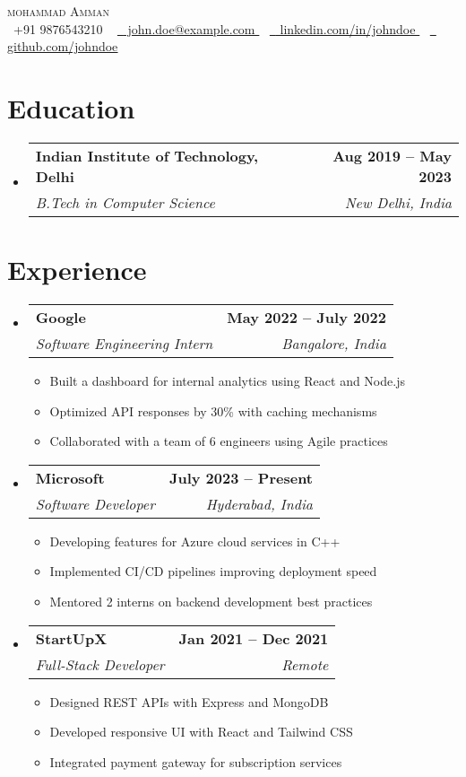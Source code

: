 \documentclass[letterpaper,11pt]{article}
\makeatletter
\newcommand{\resumeItem}[1]{\item\small{#1 \vspace{-2pt}}}
\newcommand{\resumeSubheading}[4]{
  \vspace{-2pt}\item
    \begin{tabular*}{1.0\textwidth}[t]{l@{\extracolsep{\fill}}r}
      \textbf{#1} & \textbf{\small #2} \\
      \textit{\small#3} & \textit{\small #4} \\
    \end{tabular*}\vspace{-7pt}
}
\newcommand{\resumeSubHeadingListStart}{\begin{itemize}[leftmargin=0.0in, label={}]}
\newcommand{\resumeSubHeadingListEnd}{\end{itemize}}
\newcommand{\resumeItemListStart}{\begin{itemize}}
\newcommand{\resumeItemListEnd}{\end{itemize}\vspace{-5pt}}
\makeatother
\begin{document}
\begin{center}
    {\Huge \scshape mohammad Amman } \\ \vspace{1pt}
    \small \raisebox{-0.1\height}\faPhone\ +91 9876543210 ~
    \href{mailto:john.doe@example.com }{\raisebox{-0.2\height}\faEnvelope\  \underline{ john.doe@example.com }} ~
    \href{https://linkedin.com/in/johndoe }{\raisebox{-0.2\height}\faLinkedin\ \underline{ linkedin.com/in/johndoe }}  ~
    \href{https://github.com/johndoe }{\raisebox{-0.2\height}\faGithub\ \underline{ github.com/johndoe }}
    \vspace{-8pt}
\end{center}
\section{Education}
\resumeSubHeadingListStart
  \resumeSubheading
    { Indian Institute of Technology, Delhi }{ Aug 2019 – May 2023 }
    { B.Tech in Computer Science }{ New Delhi, India }
\resumeSubHeadingListEnd

\section{Experience}
\resumeSubHeadingListStart
  \resumeSubheading
    { Google }{ May 2022 -- July 2022 }
    { Software Engineering Intern }{ Bangalore, India }
    \resumeItemListStart
      \resumeItem{ Built a dashboard for internal analytics using React and Node.js }
      \resumeItem{ Optimized API responses by 30\% with caching mechanisms }
      \resumeItem{ Collaborated with a team of 6 engineers using Agile practices }
    \resumeItemListEnd

  \resumeSubheading
    { Microsoft }{ July 2023 -- Present }
    { Software Developer }{ Hyderabad, India }
    \resumeItemListStart
      \resumeItem{ Developing features for Azure cloud services in C++ }
      \resumeItem{ Implemented CI/CD pipelines improving deployment speed }
      \resumeItem{ Mentored 2 interns on backend development best practices }
    \resumeItemListEnd
    
  \resumeSubheading
    { StartUpX }{ Jan 2021 -- Dec 2021 }
    { Full-Stack Developer }{ Remote }
    \resumeItemListStart
      \resumeItem{ Designed REST APIs with Express and MongoDB }
      \resumeItem{ Developed responsive UI with React and Tailwind CSS }
      \resumeItem{ Integrated payment gateway for subscription services }
    \resumeItemListEnd
\resumeSubHeadingListEnd
\vspace{-16pt}
\end{document}
